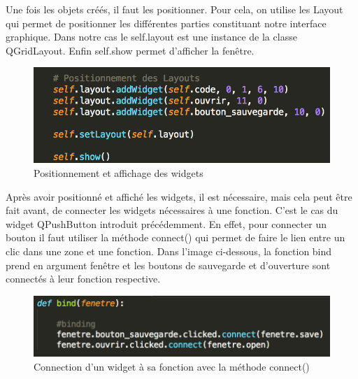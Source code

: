 \documentclass[a4paper,12pt]{article}
\begin{document}
		Une fois les objets créés, il faut les positionner. Pour cela, on utilise les Layout qui permet de positionner les différentes parties constituant notre interface graphique. Dans notre cas le self.layout est une instance de la classe QGridLayout. Enfin self.show permet d'afficher la fenêtre. 
		\newpage
		\begin{figure}[!h]

			\begin{center}

				\includegraphics[scale=0.8]{"images/Layout"}

				\caption{Positionnement et affichage des widgets}
			\end{center}

		\end{figure}

		Après avoir positionné et affiché les widgets, il est nécessaire, mais cela peut être fait avant, de connecter les widgets nécessaires à une fonction. C'est le cas du widget QPushButton introduit précédemment. En effet, pour connecter un bouton il faut utiliser la méthode connect() qui permet de faire le lien entre un clic dans une zone et une fonction. Dans l'image ci-dessous, la fonction bind prend en argument fenêtre et les boutons de sauvegarde et d'ouverture sont connectés à leur fonction respective.

		\begin{figure}[!h]

			\begin{center}

				\includegraphics[scale=0.8]{"images/Bind"}

				\caption{Connection d'un widget à sa fonction avec la méthode connect()}

			\end{center}

		\end{figure}
		
\end{document}
